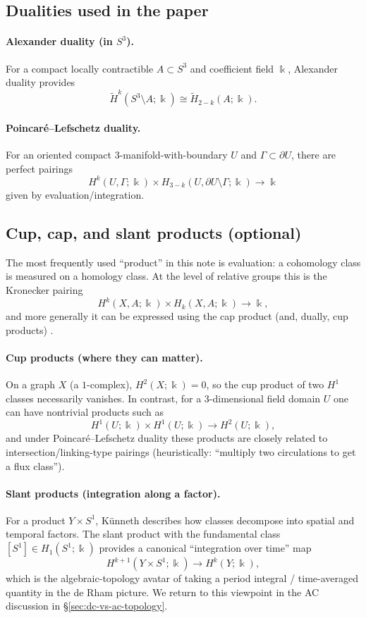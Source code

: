 \documentclass[11pt]{article}
\begin{document}
\subsection{Dualities used in the paper}
\paragraph{Alexander duality (in $S^3$).}
For a compact locally contractible $A\subset S^3$ and coefficient field $\Bbbk$, Alexander duality provides
\[
\widetilde H^k(S^3\setminus A;\Bbbk)\cong \widetilde H_{2-k}(A;\Bbbk).
\]

\paragraph{Poincar\'e--Lefschetz duality.}
For an oriented compact $3$-manifold-with-boundary $U$ and $\Gamma\subset \partial U$, there are perfect pairings
\[
H^k(U,\Gamma;\Bbbk)\times H_{3-k}(U,\partial U\setminus \Gamma;\Bbbk)\to \Bbbk
\]
given by evaluation/integration.

\subsection{Cup, cap, and slant products (optional)}
The most frequently used ``product'' in this note is evaluation: a cohomology class is measured on a homology class.
At the level of relative groups this is the Kronecker pairing
\[
H^k(X,A;\Bbbk)\times H_k(X,A;\Bbbk)\to \Bbbk,
\]
and more generally it can be expressed using the cap product (and, dually, cup products) \cite{hatcher_at_2002,bott_tu_1982}.

\paragraph{Cup products (where they can matter).}
On a graph $X$ (a $1$-complex), $H^2(X;\Bbbk)=0$, so the cup product of two $H^1$ classes necessarily vanishes.
In contrast, for a $3$-dimensional field domain $U$ one can have nontrivial products such as
\[
H^1(U;\Bbbk)\times H^1(U;\Bbbk)\to H^2(U;\Bbbk),
\]
and under Poincar\'e--Lefschetz duality these products are closely related to intersection/linking-type pairings (heuristically: ``multiply two circulations to get a flux class'').

\paragraph{Slant products (integration along a factor).}
For a product $Y\times S^1$, K\"unneth describes how classes decompose into spatial and temporal factors.
The slant product with the fundamental class $[S^1]\in H_1(S^1;\Bbbk)$ provides a canonical ``integration over time'' map
\[
H^{k+1}(Y\times S^1;\Bbbk)\to H^{k}(Y;\Bbbk),
\]
which is the algebraic-topology avatar of taking a period integral / time-averaged quantity in the de Rham picture.
We return to this viewpoint in the AC discussion in \S\ref{sec:dc-vs-ac-topology}.
\end{document}
